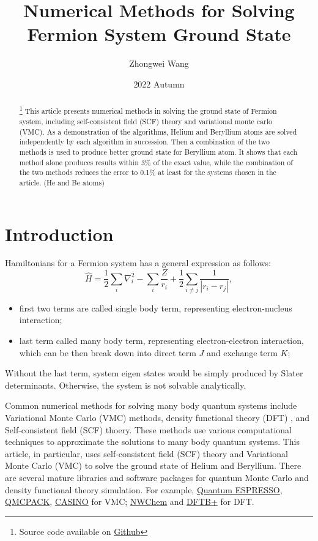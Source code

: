 \documentclass[11pt]{article}
\title{Numerical Methods for Solving Fermion System Ground State}
\author{Zhongwei Wang}
\date{2022 Autumn}
\begin{document}
\maketitle

\begin{abstract}\footnote[0]{Source code available on \href{https://github.com/Wang-Zhongwei/Many-body-ground-state-energy-by-VMC-and-SCF/tree/main}{Github}}
This article presents numerical methods in solving the ground state of Fermion system, including self-consistent field (SCF) theory and variational monte carlo (VMC). 
As a demonstration of the algorithms, Helium and Beryllium atoms are solved independently by each algorithm in succession. 
Then a combination of the two methods is used to produce better ground state for Beryllium atom. 
It shows that each method alone produces results within 3\% of the exact value, while the combination of the two methods reduces the error to 0.1\% at least for the systems chosen in the article. (He and Be atoms)
\end{abstract}

\section{Introduction}\label{section-introduction}
Hamiltonians for a Fermion system has a general expression as follows:
\begin{equation}\label{eq:hamiltonian}
\hat{H} = \frac{1}{2}\sum_{i}\nabla_i^2  - \sum_i \frac{Z}{r_i} + \frac{1}{2}\sum_{i \neq j} \frac{1}{|r_i-r_j|},
\end{equation}
\begin{itemize}
    \item first two terms are called single body term, representing electron-nucleus interaction;
    \item last term called many body term, representing electron-electron interaction, which can be then break down into 
    direct term $J$ and exchange term $K$; 
\end{itemize}
Without the last term, system eigen states would be simply produced by Slater determinants. Otherwise, the system is not solvable analytically.

Common numerical methods for solving many body quantum systems include Variational Monte Carlo (VMC) \cite{First_VMC} methods, density functional theory (DFT) \cite{First-DFT}, and Self-consistent field (SCF) \cite{Early-SCF} thoery. 
These methods use various computational techniques to approximate the solutions to many body quantum systems. This article, in particular, uses self-consistent field (SCF) theory and Variational Monte Carlo (VMC) to solve the ground state of Helium and Beryllium. 
There are several mature libraries and software packages for quantum Monte Carlo and density functional theory simulation. For example, \href{https://www.quantum-espresso.org/}{Quantum ESPRESSO}, \href{https://qmcpack.org/}{QMCPACK}, \href{https://vallico.net/casinoqmc/}{CASINO} for VMC; \href{https://www.nwchem-sw.org/}{NWChem} and \href{https://dftbplus.org/}{DFTB+} for DFT. 
\end{document}
